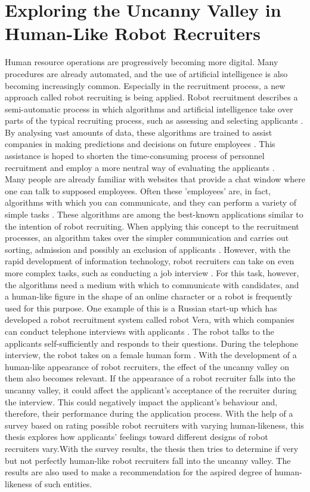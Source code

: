 \chapter{Exploring the Uncanny Valley in Human-Like Robot Recruiters}
\label{chap:6}
Human resource operations are progressively becoming more digital. Many procedures are already automated, and the use of artificial intelligence is also becoming increasingly common. Especially in the recruitment process, a new approach called robot recruiting is being applied. Robot recruitment describes a semi-automatic process in which algorithms and artificial intelligence take over parts of the typical recruiting process, such as assessing and selecting applicants \cite{robot_recruiting}. By analysing vast amounts of data, these algorithms are trained to assist companies in making predictions and decisions on future employees \cite{robot_recruiting_scholar}. This assistance is hoped to shorten the time-consuming process of personnel recruitment and employ a more neutral way of evaluating the applicants \cite{robot_recruiting_scholar}.\\
Many people are already familiar with websites that provide a chat window where one can talk to supposed employees. Often these 'employees' are, in fact, algorithms with which you can communicate, and they can perform a variety of simple tasks \cite{robot_recruiting}. These algorithms are among the best-known applications similar to the intention of robot recruiting. When applying this concept to the recruitment processes, an algorithm takes over the simpler communication and carries out sorting, admission and possibly an exclusion of applicants \cite{robot_recruiting}. However, with the rapid development of information technology, robot recruiters can take on even more complex tasks, such as conducting a job interview \cite{robot_recruiting}. For this task, however, the algorithms need a medium with which to communicate with candidates, and a human-like figure in the shape of an online character or a robot is frequently used for this purpose. One example of this is a Russian start-up which has developed a robot recruitment system called robot Vera, with which companies can conduct telephone interviews with applicants \cite{robot_recruiting}. The robot talks to the applicants self-sufficiently and responds to their questions. During the telephone interview, the robot takes on a female human form \cite{robot_recruiting}.
With the development of a human-like appearance of robot recruiters, the effect of the uncanny valley on them also becomes relevant. If the appearance of a robot recruiter falls into the uncanny valley, it could affect the applicant's acceptance of the recruiter during the interview. This could negatively impact the applicant's behaviour and, therefore, their performance during the application process.
With the help of a survey based on rating possible robot recruiters with varying human-likeness, this thesis explores how applicants' feelings toward different designs of robot recruiters vary.With the survey results, the thesis then tries to determine if very but not perfectly human-like robot recruiters fall into the uncanny valley. The results are also used to make a recommendation for the aspired degree of human-likeness of such entities. 

